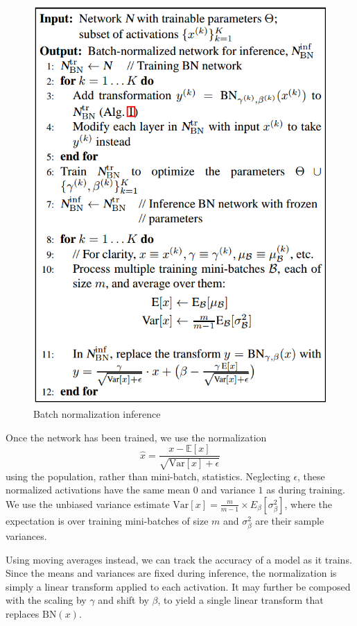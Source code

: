 \documentclass[a4paper, 12pt]{book} %
\begin{document}
\begin{figure}[htpb]
	\centering
	\includegraphics[width=\linewidth]{figures/bn_inference.png}
	\caption{Batch normalization inference}
	\label{fig:boat1}
\end{figure}
Once the network has been trained, we use the
normalization
$$\hat{x}=\frac{x-\mathbb{E}{[x]}}{\sqrt{\mathrm{Var}{[x]}+\epsilon}}$$
using the population, rather than mini-batch, statistics. Neglecting $\epsilon$, these normalized activations have the same mean $0$ and variance $1$ as during training. We use the unbiased variance estimate $\mathrm{Var}{[x]} = \frac{m}{m-1} \times E_{\beta}{[\sigma_{\beta}^2]}$, where
the expectation is over training mini-batches of size $m$ and $\sigma_{\beta}^2$ are their sample variances. 

Using moving averages instead, we can track the accuracy of a model as it trains.
Since the means and variances are fixed during inference,
the normalization is simply a linear transform applied to
each activation. It may further be composed with the scaling by $\gamma$ and shift by $\beta$, to yield a single linear transform
that replaces $\mathrm{BN}(x)$.
\end{document}
